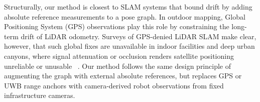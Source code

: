 Structurally, our method is closest to SLAM systems that bound drift by adding
absolute reference measurements to a pose graph.
In outdoor mapping, Global Positioning System (GPS) observations play this role
by constraining the long-term drift of LiDAR odometry.
Surveys of GPS-denied LiDAR SLAM make clear, however, that such global fixes are
unavailable in indoor facilities and deep urban canyons, where signal
attenuation or occlusion renders satellite positioning unreliable or unusable
~\cite{jiang2025gpsdenied}.
Our method follows the same design principle of augmenting the graph with
external absolute references, but replaces GPS or UWB range anchors with
camera-derived robot observations from fixed infrastructure cameras.
